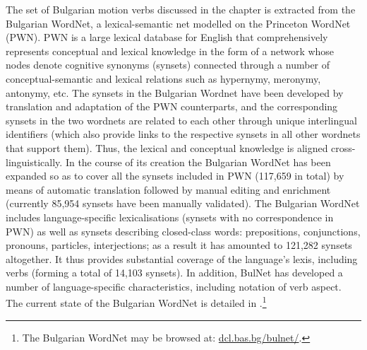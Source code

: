 \documentclass[output=paper,colorlinks,citecolor=brown]{langscibook}
\begin{document}
The set of Bulgarian motion verbs discussed in the chapter is extracted from the Bulgarian WordNet, a lexical-semantic net modelled on the Princeton WordNet (PWN). PWN \citep{Miller1995,Fellbaum1998} is a large lexical database for English that comprehensively represents conceptual and lexical knowledge in the form of a network whose nodes denote cognitive synonyms (synsets) connected through a number of conceptual-semantic and lexical relations such as hypernymy, meronymy, antonymy, etc. The synsets in the Bulgarian Wordnet  have been developed by translation and adaptation of the PWN counterparts, and the corresponding synsets in the two wordnets are related to each other through unique interlingual identifiers (which also provide links to the respective synsets in all other wordnets that support them). Thus, the lexical and conceptual knowledge is aligned cross-linguistically. In the course of its creation the Bulgarian WordNet has been expanded so as to cover all the synsets included in PWN (117,659 in total) by means of automatic translation followed by manual editing and enrichment (currently 85,954 synsets have been manually validated). The Bulgarian WordNet includes language-specific lexicalisations (synsets with no correspondence in PWN) as well as synsets describing closed-class words: prepositions, conjunctions, pronouns, particles, interjections; as a result it has amounted to 121,282 synsets altogether. It thus provides substantial coverage of the language's lexis, including verbs (forming a total of 14,103 synsets). In addition, BulNet has developed a number of language-specific characteristics, including notation of verb aspect. The current state of the Bulgarian WordNet is detailed in \citet{koeva2021-wordnet}.\footnote{The Bulgarian WordNet may be browsed at: \url{dcl.bas.bg/bulnet/}.} 
\end{document}
